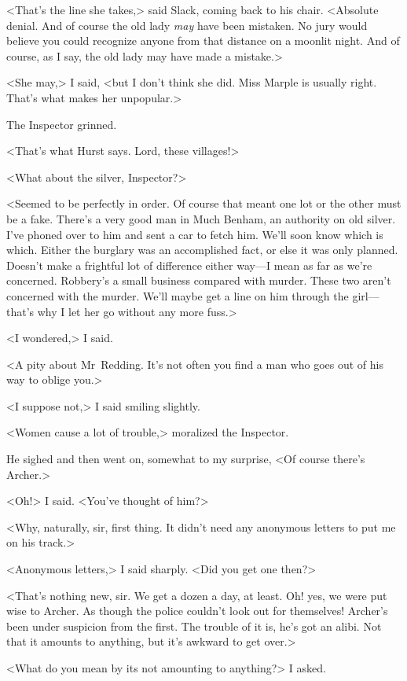 <That's the line she takes,> said Slack, coming back to his chair. <Absolute denial. And of course the old lady \emph{may} have been mistaken. No jury would believe you could recognize anyone from that distance on a moonlit night. And of course, as I say, the old lady may have made a mistake.>

<She may,> I said, <but I don't think she did. Miss Marple is usually right. That's what makes her unpopular.>

The Inspector grinned.

<That's what Hurst says. Lord, these villages!>

<What about the silver, Inspector?>

<Seemed to be perfectly in order. Of course that meant one lot or the other must be a fake. There's a very good man in Much Benham, an authority on old silver. I've phoned over to him and sent a car to fetch him. We'll soon know which is which. Either the burglary was an accomplished fact, or else it was only planned. Doesn't make a frightful lot of difference either way—I mean as far as we're concerned. Robbery's a small business compared with murder. These two aren't concerned with the murder. We'll maybe get a line on him through the girl—that's why I let her go without any more fuss.>

<I wondered,> I said.

<A pity about Mr~Redding. It's not often you find a man who goes out of his way to oblige you.>

<I suppose not,> I said smiling slightly.

<Women cause a lot of trouble,> moralized the Inspector.

He sighed and then went on, somewhat to my surprise, <Of course there's Archer.>

<Oh!> I said. <You've thought of him?>

<Why, naturally, sir, first thing. It didn't need any anonymous letters to put me on his track.>

<Anonymous letters,> I said sharply. <Did you get one then?>

<That's nothing new, sir. We get a dozen a day, at least. Oh! yes, we were put wise to Archer. As though the police couldn't look out for themselves! Archer's been under suspicion from the first. The trouble of it is, he's got an alibi. Not that it amounts to anything, but it's awkward to get over.>

<What do you mean by its not amounting to anything?> I asked.

